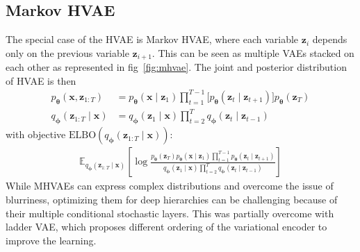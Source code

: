 \subsection{Markov HVAE}
The special case of the HVAE is Markov HVAE, where each variable $\boldsymbol{z}_i$ depends only on the previous variable $\boldsymbol{z}_{i+1}$. This can be
seen as multiple VAEs stacked on each other as represented in fig~\ref{fig:mhvae}. The joint and posterior distribution of HVAE is then
\begin{align*}
    p_{\boldsymbol{\theta}}(\boldsymbol{x},\boldsymbol{z}_{1:T})&=p_{\boldsymbol{\theta}}(\boldsymbol{x}\mid\boldsymbol{z}_1)\prod_{t=1}^{T-1} \bigl[   p_{\boldsymbol{\theta}}(\boldsymbol{z}_{t}\mid\boldsymbol{z}_{t+1}) \bigr]  p_{\boldsymbol{\theta}}(\boldsymbol{z}_{T}) \\
    q_{\boldsymbol{\phi}}(\boldsymbol{z}_{1:T}\mid\boldsymbol{x}) &= q_{\boldsymbol{\phi}}(\boldsymbol{z}_1\mid\boldsymbol{x})\prod_{t=2}^{T}q_{\boldsymbol{\phi}}(\boldsymbol{z}_{t}\mid\boldsymbol{z}_{t-1}) 
\end{align*}
with objective $\mathrm{ELBO}(q_{\boldsymbol{\phi}}(\boldsymbol{z}_{1:T}\mid\boldsymbol{x}))$:
\begin{align*}
    \mathbb{E}_{q_{\boldsymbol{\phi}}(\boldsymbol{z}_{1:T}\mid\boldsymbol{x})}\left[\log \frac{p_{\boldsymbol{\theta}}(\boldsymbol{z}_T)p_{\boldsymbol{\theta}}(\boldsymbol{x}\mid\boldsymbol{z}_1)\prod_{t=1}^{T-1}p_{\boldsymbol{\theta}}(\boldsymbol{z}_{t}\mid\boldsymbol{z}_{t+1})}{q_{\boldsymbol{\phi}}(\boldsymbol{z}_1\mid\boldsymbol{x})\prod_{t=2}^{T}q_{\boldsymbol{\phi}}(\boldsymbol{z}_{t}\mid\boldsymbol{z}_{t-1})}\right]
\end{align*}
While MHVAEs can express complex distributions and overcome the issue of blurriness, optimizing them for deep hierarchies can be challenging because of their multiple conditional stochastic layers.
This was partially overcome with ladder VAE, which proposes different ordering of the variational encoder to improve the learning. 
